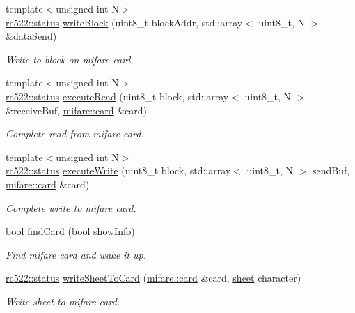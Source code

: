 \begin{DoxyCompactItemize}
{\footnotesize template$<$unsigned int N$>$ }\\\hyperlink{classspiReader_a4bcf984823c38cf4841ebf619e788790}{rc522\+::status} \hyperlink{classrc522_ae660e16f131e5a28a4412b26d1f016a0}{write\+Block} (uint8\+\_\+t block\+Addr, std\+::array$<$ uint8\+\_\+t, N $>$ \&data\+Send)
\begin{DoxyCompactList}\small\item\em Write to block on mifare card. \end{DoxyCompactList}\item 
{\footnotesize template$<$unsigned int N$>$ }\\\hyperlink{classspiReader_a4bcf984823c38cf4841ebf619e788790}{rc522\+::status} \hyperlink{classrc522_aa0eeb1eedf5ca47a44cab85a387156f3}{execute\+Read} (uint8\+\_\+t block, std\+::array$<$ uint8\+\_\+t, N $>$ \&receive\+Buf, \hyperlink{classmifare_1_1card}{mifare\+::card} \&card)
\begin{DoxyCompactList}\small\item\em Complete read from mifare card. \end{DoxyCompactList}\item 
{\footnotesize template$<$unsigned int N$>$ }\\\hyperlink{classspiReader_a4bcf984823c38cf4841ebf619e788790}{rc522\+::status} \hyperlink{classrc522_adab984cd49ca9affb679dded266c43f0}{execute\+Write} (uint8\+\_\+t block, std\+::array$<$ uint8\+\_\+t, N $>$ send\+Buf, \hyperlink{classmifare_1_1card}{mifare\+::card} \&card)
\begin{DoxyCompactList}\small\item\em Complete write to mifare card. \end{DoxyCompactList}\item 
bool \hyperlink{classrc522_a3183014b1670c6c3cdb47ec857967476}{find\+Card} (bool show\+Info)
\begin{DoxyCompactList}\small\item\em Find mifare card and wake it up. \end{DoxyCompactList}\item 
\hyperlink{classspiReader_a4bcf984823c38cf4841ebf619e788790}{rc522\+::status} \hyperlink{classrc522_a69f4af5f03ac07d17918880e4f9e09c3}{write\+Sheet\+To\+Card} (\hyperlink{classmifare_1_1card}{mifare\+::card} \&card, \hyperlink{classsheet}{sheet} character)
\begin{DoxyCompactList}\small\item\em Write sheet to mifare card. \end{DoxyCompactList}\item 

\end{DoxyCompactItemize}
